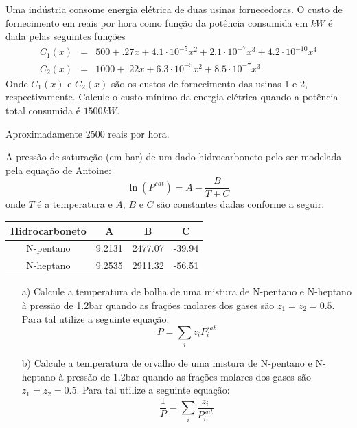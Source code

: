 \begin{Exercise}[title=Otimização] \label{usinas} Uma indústria consome energia elétrica de duas usinas fornecedoras. O custo de fornecimento em reais por hora como função da potência consumida em $kW$ é dada pelas seguintes funções
\begin{eqnarray*}
C_1(x)&=& 500+.27 x + 4.1\cdot 10^{-5}x^2 +2.1\cdot 10^{-7}x^3+4.2\cdot 10^{-10}x^4 \\
C_2(x)&=& 1000+.22 x + 6.3\cdot 10^{-5}x^2 +8.5\cdot 10^{-7}x^3
\end{eqnarray*}
Onde $C_1(x)$ e $C_2(x)$ são os custos de fornecimento das usinas 1 e 2, respectivamente. Calcule o custo mínimo da energia elétrica quando a potência total consumida é  $1500kW$.

\end{Exercise}
\begin{Answer}
  \begin{tiny}
 Aproximadamente 2500 reais por hora.    
  \end{tiny}
\end{Answer}

\begin{Exercise}[title= Termodinâmica] A pressão de saturação (em bar) de um dado hidrocarboneto pelo ser modelada pela equação de Antoine:
$$\ln\left(P^{sat}\right)=A-\frac{B}{T+C}$$
onde $T$ é a temperatura e $A$, $B$ e $C$ são constantes dadas conforme a seguir:

\begin{tabular}{|c|c|c|c|}
\hline
Hidrocarboneto&A&B&C\\
\hline
N-pentano & 9.2131 & 2477.07 & -39.94 \\
\hline
N-heptano & 9.2535 &2911.32 &-56.51 \\
\hline
\end{tabular}
\begin{itemize}
\item[a)] Calcule a temperatura de bolha de uma mistura de N-pentano e N-heptano à pressão de 1.2bar quando as frações molares  dos gases são  $z_1=z_2=0.5$. Para tal utilize a seguinte equação:
$$P=\sum_i z_i P_i^{sat}$$
\item[b)] Calcule a temperatura de orvalho de uma mistura de N-pentano e N-heptano à pressão de 1.2bar quando as frações molares  dos gases são  $z_1=z_2=0.5$. Para tal utilize a seguinte equação:
$$\frac{1}{P}=\sum_i \frac{z_i}{P_i^{sat}}$$
\end{itemize}
\end{Exercise}

